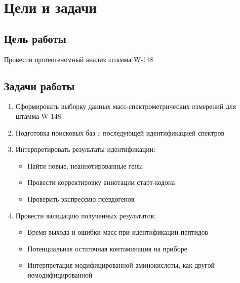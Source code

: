 \section{Цели и задачи}
\subsection{Цель работы}
    Провести протеогеномный анализ штамма  W-148 

\subsection{Задачи работы}

\begin{enumerate} 
    \item Сформировать выборку данных масс-спектрометрических измерений для штамма W-148
    \item Подготовка поисковых баз c последующей идентификацией спектров
    \item Интерпретировать результаты идентификации:
    \begin{itemize}
        \item Найти новые, неаннотированные гены
        \item Провести корректировку аннотации старт-кодона
        \item Проверить экспрессию псевдогенов
    \end{itemize} 
    \item Провести валидацию полученных результатов:
    \begin{itemize}
        \item Время выхода и ошибки масс при идентификации пептидов
        \item Потенциальная остаточная контаминация на приборе
        \item Интерпретация модифицированной аминокислоты, как другой немодифицированной
    \end{itemize}
    
\end{enumerate}

\newpage